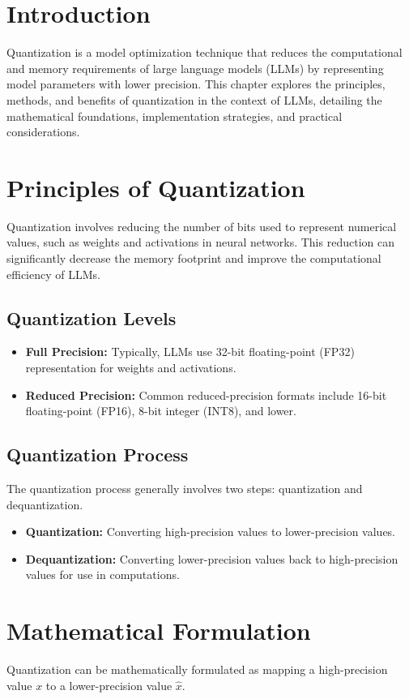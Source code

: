 \section{Introduction}
Quantization is a model optimization technique that reduces the computational and memory requirements of large language models (LLMs) by representing model parameters with lower precision. This chapter explores the principles, methods, and benefits of quantization in the context of LLMs, detailing the mathematical foundations, implementation strategies, and practical considerations.

\section{Principles of Quantization}
Quantization involves reducing the number of bits used to represent numerical values, such as weights and activations in neural networks. This reduction can significantly decrease the memory footprint and improve the computational efficiency of LLMs.

\subsection{Quantization Levels}
\begin{itemize}
    \item \textbf{Full Precision:} Typically, LLMs use 32-bit floating-point (FP32) representation for weights and activations.
    \item \textbf{Reduced Precision:} Common reduced-precision formats include 16-bit floating-point (FP16), 8-bit integer (INT8), and lower.
\end{itemize}

\subsection{Quantization Process}
The quantization process generally involves two steps: quantization and dequantization.
\begin{itemize}
    \item \textbf{Quantization:} Converting high-precision values to lower-precision values.
    \item \textbf{Dequantization:} Converting lower-precision values back to high-precision values for use in computations.
\end{itemize}

\section{Mathematical Formulation}
Quantization can be mathematically formulated as mapping a high-precision value \( x \) to a lower-precision value \( \hat{x} \).

